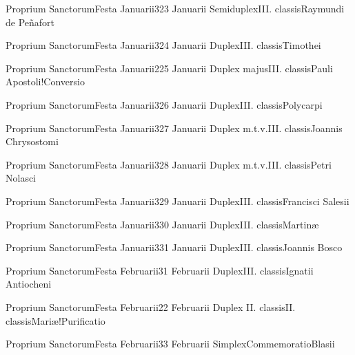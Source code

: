 \documentclass[psalterium-feriale.tex]{subfiles}
\begin{document}
	{Proprium Sanctorum}{Festa Januarii}{3}{23 Januarii}
	{Semiduplex}{III. classis}{Raymundi de Peñafort}
	{}
	{}

	{Proprium Sanctorum}{Festa Januarii}{3}{24 Januarii}
	{Duplex}{III. classis}{Timothei}
	{}
	{}

	{Proprium Sanctorum}{Festa Januarii}{2}{25 Januarii}
	{Duplex majus}{III. classis}{Pauli Apostoli!Conversio}
	{}
	{}
\psalmodiapropria

	{Proprium Sanctorum}{Festa Januarii}{3}{26 Januarii}
	{Duplex}{III. classis}{Polycarpi}
	{}
	{}

	{Proprium Sanctorum}{Festa Januarii}{3}{27 Januarii}
	{Duplex m.t.v.}{III. classis}{Joannis Chrysostomi}
	{}
	{}

	{Proprium Sanctorum}{Festa Januarii}{3}{28 Januarii}
	{Duplex m.t.v.}{III. classis}{Petri Nolasci}
	{}
	{}

	{Proprium Sanctorum}{Festa Januarii}{3}{29 Januarii}
	{Duplex}{III. classis}{Francisci Salesii}
	{}
	{}

	{Proprium Sanctorum}{Festa Januarii}{3}{30 Januarii}
	{Duplex}{III. classis}{Martinæ}
	{}
	{}

	{Proprium Sanctorum}{Festa Januarii}{3}{31 Januarii}
	{Duplex}{III. classis}{Joannis Bosco}
	{}
	{}

	{Proprium Sanctorum}{Festa Februarii}{3}{1 Februarii}
	{Duplex}{III. classis}{Ignatii Antiocheni}
	{}
	{}

	{Proprium Sanctorum}{Festa Februarii}{2}{2 Februarii}
	{Duplex II. classis}{II. classis}{Mariæ!Purificatio}
	{}
	{}
\psalmodiapropria

	{Proprium Sanctorum}{Festa Februarii}{3}{3 Februarii}
	{Simplex}{Commemoratio}{Blasii}
	{}
	{}
\end{document}
